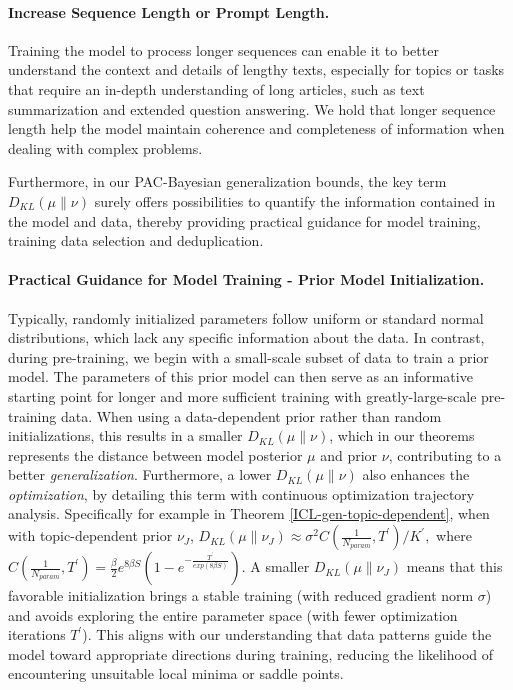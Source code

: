 \paragraph{Increase Sequence Length or Prompt Length.} Training the model to process longer sequences can enable it to better understand the context and details of lengthy texts, especially for topics or tasks that require an in-depth understanding of long articles, such as text summarization and extended question answering. We hold that longer sequence length help the model maintain coherence and completeness of information when dealing with complex problems.

Furthermore, in our PAC-Bayesian generalization bounds, the key term $D_{KL}(\mu \parallel \nu)$ surely offers possibilities to quantify the information contained in the model and data, thereby providing practical guidance for model training, training data selection and deduplication.

\paragraph{Practical Guidance for Model Training - Prior Model Initialization.} Typically, randomly initialized parameters follow uniform or standard normal distributions, which lack any specific information about the data. In contrast, during pre-training, we begin with a small-scale subset of data to train a prior model. The parameters of this prior model can then serve as an informative starting point for longer and more sufficient training with greatly-large-scale pre-training data. When using a data-dependent prior rather than random initializations, this results in a smaller $D_{KL}(\mu \parallel \nu)$, which in our theorems represents the distance between model posterior $\mu$ and prior $\nu$, contributing to a better \emph{generalization}. Furthermore, a lower $D_{KL}(\mu \parallel \nu)$ also enhances the \emph{optimization}, by detailing this term with continuous optimization trajectory analysis. Specifically for example in Theorem \ref{ICL-gen-topic-dependent}, when with topic-dependent prior $\nu_J$,
$
D_{KL}(\mu \parallel \nu_J) \approx \sigma^2 C(\frac{1}{N_{param}}, T^\prime)/K^\prime,
$
where $C(\frac{1}{N_{param}}, T^\prime) = \frac{\beta}{2} e^{8\beta S}(1-e^{-\frac{T^\prime}{exp(8\beta S)}})$. A smaller $D_{KL}(\mu \parallel \nu_J)$ means that this favorable initialization brings a stable training (with reduced gradient norm $\sigma$) and avoids exploring the entire parameter space (with fewer optimization iterations $T^\prime$). This aligns with our understanding that data patterns guide the model toward appropriate directions during training, reducing the likelihood of encountering unsuitable local minima or saddle points.

